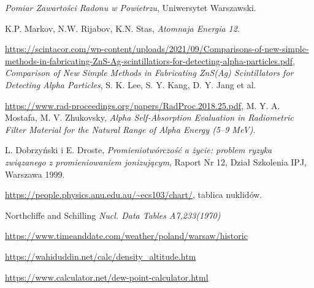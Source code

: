 \documentclass[12pt]{article}
\begin{document}
\begin{thebibliography}{10}

	\emph{Pomiar Zawartości Radonu w Powietrzu}, Uniwersytet Warszawski.

	K.P. Markov, N.W. Rijabov, K.N. Stas, \emph{Atomnaja Energia 12}.

	\url{https://scintacor.com/wp-content/uploads/2021/09/Comparisons-of-new-simple-methods-in-fabricating-ZnS-Ag-scintillatiors-for-detecting-alpha-particles.pdf},
	\emph{Comparison of New Simple Methods in Fabricating ZnS(Ag) Scintillators for Detecting Alpha Particles},
	S. K. Lee, S. Y. Kang, D. Y. Jang et al.

	\url{https://www.rad-proceedings.org/papers/RadProc.2018.25.pdf},
	M. Y. A. Mostafa, M. V. Zhukovsky, \emph{Alpha Self-Absorption Evaluation in Radiometric Filter Material for the Natural Range of Alpha Energy (5–9 MeV)}.

	L. Dobrzyński i E. Droste, \emph{Promieniotwórczość a życie: problem ryzyka związanego z promieniowaniem jonizującym}, Raport Nr 12, Dział Szkolenia IPJ, Warszawa 1999.

	\url{https://people.physics.anu.edu.au/~ecs103/chart/}, tablica nuklidów.

	Northcliffe and Schilling \emph{Nucl. Data Tables A7,233(1970)}

	\url{https://www.timeanddate.com/weather/poland/warsaw/historic}

	\url{https://wahiduddin.net/calc/density_altitude.htm}

	\url{https://www.calculator.net/dew-point-calculator.html}

\end{thebibliography}
\end{document}
